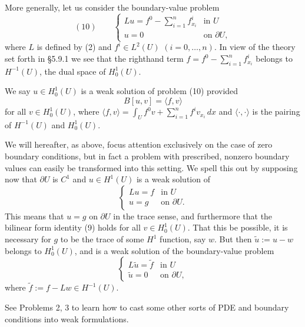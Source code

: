 More generally, let us consider the boundary-value problem
$$(10) \qquad \begin{cases} Lu = f^0 - \sum_{i=1}^n f^i_{x_i} & \text{in } U \\ u = 0 & \text{on } \partial U, \end{cases}$$
where $L$ is defined by (2) and $f^i \in L^2(U)$ $(i=0,\ldots,n)$. In view of the theory set forth in \S5.9.1 we see that the righthand term $f = f^0 - \sum_{i=1}^n f^i_{x_i}$ belongs to $H^{-1}(U)$, the dual space of $H_0^1(U)$.

\begin{definition}
\label{def:weak-solution-elliptic-bvp}
We say $u \in H_0^1(U)$ is a weak solution of problem (10) provided
$$B[u,v] = \langle f,v \rangle$$
for all $v \in H_0^1(U)$, where $\langle f,v \rangle = \int_U f^0 v + \sum_{i=1}^n f^i v_{x_i} \, dx$ and $\langle \cdot,\cdot \rangle$ is the pairing of $H^{-1}(U)$ and $H_0^1(U)$.
\end{definition}

\begin{remark}
\label{rem:nonzero-boundary-weak-solution}
We will hereafter, as above, focus attention exclusively on the case of zero boundary conditions, but in fact a problem with prescribed, nonzero boundary values can easily be transformed into this setting. We spell this out by supposing now that $\partial U$ is $C^1$ and $u \in H^1(U)$ is a weak solution of
$$\begin{cases} Lu = f & \text{in } U \\ u = g & \text{on } \partial U. \end{cases}$$
This means that $u = g$ on $\partial U$ in the trace sense, and furthermore that the bilinear form identity (9) holds for all $v \in H_0^1(U)$. That this be possible, it is necessary for $g$ to be the trace of some $H^1$ function, say $w$. But then $\tilde u := u - w$ belongs to $H_0^1(U)$, and is a weak solution of the boundary-value problem
$$\begin{cases} L\tilde u = \tilde f & \text{in } U \\ \tilde u = 0 & \text{on } \partial U, \end{cases}$$
where $\tilde f := f - Lw \in H^{-1}(U)$.

See Problems 2, 3 to learn how to cast some other sorts of PDE and boundary conditions into weak formulations.
\end{remark}

